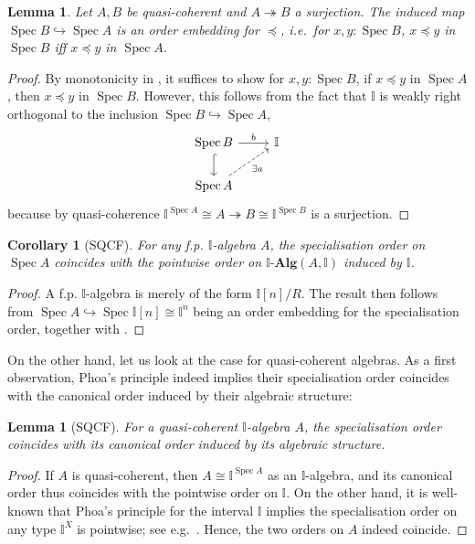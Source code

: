 \documentclass[12pt]{amsart}
\newtheorem{lemma}[theorem]{Lemma}
\newtheorem{corollary}[theorem]{Corollary}
\theoremstyle{definition}
\newcommand{\mb}[1]{\mathbf{#1}}
\newcommand{\mbb}[1]{\mathbb{#1}}
\newcommand{\I}{\mbb I}
\newcommand{\alg}{\text{-}\mb{Alg}}
\newcommand{\surj}{\twoheadrightarrow}
\newcommand{\hook}{\hookrightarrow}
\newcommand{\spec}{\operatorname{Spec}}
\begin{document}
\begin{lemma}\label{lem:orderonaffine}
  Let $A,B$ be quasi-coherent and $A \surj B$ a surjection. The induced map $\spec B \hook \spec A$ is an order embedding for $\preceq$, i.e.\ for $x,y : \spec B$, $x \preceq y$ in $\spec B$ iff $x \preceq y$ in $\spec A$.
\end{lemma}
\begin{proof}
  By monotonicity in , it suffices to show for $x,y : \spec B$, if $x \preceq y$ in $\spec A$, then $x \preceq y$ in $\spec B$. However, this follows from the fact that $\I$ is weakly right orthogonal to the inclusion $\spec B \hook \spec A$,
  \[
  \begin{tikzcd}
    \spec B \ar[d, hook] \ar[r, "b"] & \I \\ 
    \spec A \ar[ur, dashed, "\exists a"'] 
  \end{tikzcd}
  \]
  because by quasi-coherence $\I^{\spec A} \cong A \surj B \cong \I^{\spec B}$ is a surjection. 
\end{proof}

\begin{corollary}[SQCF]
  For any f.p. $\I$-algebra $A$, the specialisation order on $\spec A$ coincides with the pointwise order on $\I\alg(A,\I)$ induced by $\I$.
\end{corollary}
\begin{proof}
  A f.p. $\I$-algebra is merely of the form $\I[n]/R$. The result then follows from $\spec A \hook \spec \I[n] \cong \I^n$ being an order embedding for the specialisation order, together with .
\end{proof}


On the other hand, let us look at the case for quasi-coherent algebras. As a first observation, Phoa's principle indeed implies their specialisation order coincides with the canonical order induced by their algebraic structure:

\begin{lemma}[SQCF]\label{cor:specordonalgiscan}
  For a quasi-coherent $\I$-algebra $A$, the specialisation order coincides with its canonical order induced by its algebraic structure.
\end{lemma}
\begin{proof}
  If $A$ is quasi-coherent, then $A \cong \I^{\spec A}$ as an $\I$-algebra, and its canonical order thus coincides with the pointwise order on $\I$. On the other hand, it is well-known that Phoa's principle for the interval $\I$ implies the specialisation order on any type $\I^X$ is pointwise; see e.g.~\cite[Thm. 4.2.1]{hyland1990first}. Hence, the two orders on $A$ indeed coincide.
\end{proof}
\end{document}
